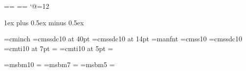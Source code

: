 \def\pif{\char39}

\def\onepageout#1{{\setbox255=\vbox{#1}
  \hsize=\pagewidth \vsize=\pageheight \plainoutput}}
\def\normaloutput{\onepageout{}}

\output={\normaloutput}
\newbox\partialpage \newdimen\origvsize \newif\ifrigid
\def\begindoublecolumns{\global\origvsize=\vsize \begingroup
  \output={\global\setbox\partialpage=\vbox{\unvbox255\kern0pt}}\eject
  \output={\doublecolumnout} \hsize=\colwidth \dimen@=\pageheight
  \advance\dimen@ by-\ht\partialpage \multiply\dimen@ by2
  \ifdim\dimen@<2\baselineskip \dimen@=2\baselineskip\fi
  \vsize=\dimen@}
\def\enddoublecolumns{\output={\balancecolumns}\eject
  \endgroup \global\vsize=\origvsize \pagegoal=\vsize}
\def\doublecolumnout{\splittopskip=\topskip \splitmaxdepth=\maxdepth
  \setbox0=\vsplit255 to.5\vsize \setbox2=\vsplit255 to.5\vsize
  \onepageout\pagesofar \global\vsize=2\pageheight
  \unvbox255 \penalty\outputpenalty}
\def\pagesofar{\unvbox\partialpage
  \wd0=\hsize \wd2=\hsize \hbox to\pagewidth{\box0\hfil\separator\hfil\box2}}
\def\norulesep{\let\separator=\relax}
\def\rulesep{\let\separator=\vrule}
\let\separator=\relax
\def\balancecolumns{\setbox0=\vbox{\unvbox255} \dimen@=\ht0
  \advance\dimen@ by\topskip \advance\dimen@ by-\baselineskip
  \divide\dimen@ by2 \splittopskip=\topskip
  {\vbadness=10000 \loop \global\setbox3=\copy0
    \global\setbox1=\vsplit3 to\dimen@
    \ifdim\ht3>\dimen@ \global\advance\dimen@ by1pt \repeat}
  \ifrigid
    \setbox0=\vtop{\unvbox1}
    \setbox2=\vtop{\unvbox3}
  \else
    \setbox0=\vbox to\dimen@{\unvbox1}
    \setbox2=\vbox to\dimen@{\dimen2=\dp3 \unvbox3\kern-\dimen2 \vfil}
  \fi
  \global\vsize=\origvsize \pagesofar}
\catcode`@=12

\colwidth 19pc
\newdimen\manindent      \manindent 3pc
\newdimen\smallmanindent \smallmanindent 1pc
\parskip 1ex plus 0.5ex minus 0.5ex
\parindent 0pt

\font\inchhigh=cminch
\font\titlefont=cmssdc10 at 40pt
\font\secfont=cmssdc10 at 14pt
\font\manual=manfnt
\font\sf=cmss10
\font\bsf=cmssdc10
\font\sevenit=cmti10 at 7pt \scriptfont\itfam=\sevenit
\font\fiveit=cmti10 at 5pt  \scriptscriptfont\itfam=\fiveit

\newfam\msbfam \def\Bbb{\fam\msbfam}
\font\tenmsb=msbm10         \textfont\msbfam=\tenmsb
\font\sevenmsb=msbm7        \scriptfont\msbfam=\sevenmsb
\font\fivemsb=msbm5         \scriptscriptfont\msbfam=\fivemsb

